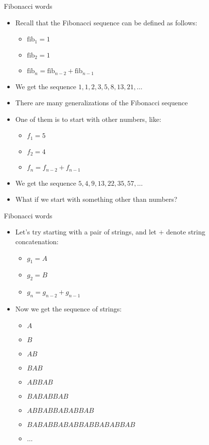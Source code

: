 \documentclass[12pt,t]{beamer}
\newcommand{\bi}{\begin{itemize}}
\newcommand{\ei}{\end{itemize}}
\begin{document}
\begin{frame}{Fibonacci words}
    \bi
        \item Recall that the Fibonacci sequence can be defined as follows:
            \bi
        \item $\mathrm{fib}_1 = 1$
        \item $\mathrm{fib}_2 = 1$
        \item $\mathrm{fib}_n = \mathrm{fib}_{n-2} + \mathrm{fib}_{n-1}$
            \ei
        \item We get the sequence $1, 1, 2, 3, 5, 8, 13, 21, \ldots$
        \vspace{10pt}
        \item There are many generalizations of the Fibonacci sequence
        \item One of them is to start with other numbers, like:
            \bi
                \item $f_1 = 5$
                \item $f_2 = 4$
                \item $f_n = f_{n-2} + f_{n-1}$
            \ei
        \item We get the sequence $5, 4, 9, 13, 22, 35, 57, \ldots$
        \vspace{10pt}
        \item What if we start with something other than numbers?
    \ei
\end{frame}

\begin{frame}{Fibonacci words}
    \vspace{10pt}
    \bi
        \item Let's try starting with a pair of strings, and let $+$ denote string concatenation:
            \bi
                \item $g_1 = A$
                \item $g_2 = B$
                \item $g_n = g_{n-2} + g_{n-1}$
            \ei
        \vspace{10pt}
        \item Now we get the sequence of strings:
            \bi
                \item $A$
                \item $B$
                \item $AB$
                \item $BAB$
                \item $ABBAB$
                \item $BABABBAB$
                \item $ABBABBABABBAB$
                \item $BABABBABABBABBABABBAB$
                \item $\ldots$
            \ei
    \ei
\end{frame}
\end{document}
